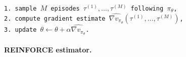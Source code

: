 \documentclass[a4paper]{report}
\theoremstyle{definition}
\theoremstyle{plain}
\begin{document}
\vspace{1em}
\noindent
\hspace*{1em} \texttt{1. sample $M$ episodes $\tau^{(1)}, \dots, \tau^{(M)}$ following $\pi_{\theta}$,}\\
\hspace*{1em} \texttt{2. compute gradient estimate $\widehat{\nabla v_{\pi_{\theta}}}(\tau^{(1)}, \dots, \tau^{(M)})$,} \\
\hspace*{1em} \texttt{3. update $\theta \leftarrow \theta + \alpha \widehat{\nabla v_{\pi_{\theta}}}$.}

\paragraph{REINFORCE estimator.}
\end{document}
